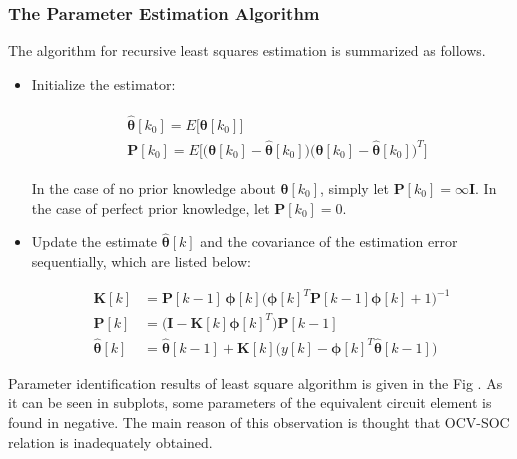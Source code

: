 \documentclass[12pt]{article}
\begin{document}
\subsubsection{The Parameter Estimation Algorithm}
The algorithm for recursive least squares estimation is summarized as follows.

\begin{itemize}
	\item Initialize the estimator:
	
	\begin{align}
	\label{eqn:RLS_Algorithm_01}
	\begin{split}
	& \bm{\hat{\theta}}[k_{0}] = E\big[\bm{\theta}[k_{0}]\big] \\
	& \bm{P}[k_{0}] = E\bigg[\big(\bm{\theta}[k_{0}]-\bm{\hat{\theta}}[k_{0}])(\bm{\theta}[k_{0}]-\bm{\hat{\theta}}[k_{0}]\big)^{T}\bigg]
	\end{split}
	\end{align}
	
	In the case of no prior knowledge about $\bm{\theta}[k_{0}]$, simply let $\bm{P}[k_{0}]=\infty \bm{I}$. In the case of perfect prior knowledge, let $\bm{P}[k_0] = 0$.
	
	\item Update the estimate $\bm{\hat{\theta}}[k]$ and the covariance of the estimation error sequentially, which are listed below:
	
	\begin{subequations} 
		\label{eqn:RLS_equations}
		\begin{align} \bm{K}[k] &= \bm{P}[k-1]\,\bm{\phi}[k]\big(\bm{\phi}[k]^{T}\bm{P}[k-1]\bm{\phi}[k]+1\big)^{-1} \\ 
		\bm{P}[k] &= \big(\bm{I} - \bm{K}[k]\bm{\phi}[k]^{T}\big)\bm{P}[k-1] \\
		\bm{\hat{\theta}}[k] &= \bm{\hat{\theta}}[k-1] + \bm{K}[k]\big(y[k]-\bm{\phi}[k]^{T}\bm{\hat{\theta}}[k-1]) 
		\end{align} 
	\end{subequations} 
	
\end{itemize}

 

\noindent Parameter identification results of  least square algorithm is given in the Fig . As it can be seen in subplots, some parameters of the equivalent circuit element is found in negative. The main reason of this observation is thought that OCV-SOC relation is inadequately obtained.  
\end{document}
